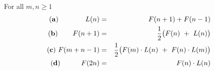 \begin{prop}
\label{thm:Lucas-n:2Fibs}
For all $m, n \geq 1$
\begin{eqnarray}
\label{eq:L-F-a}
{\bf (a)} \  \hspace*{.49in}
L(n) & = & F(n+1) + F(n-1) \\
\label{eq:L-F-b}
{\bf (b)} \  \hspace*{.25in}
F(n+1) & = & \frac{1}{2} \big(F(n) \ + \ L(n) \big) \\
\label{eq:L-F-c}
{\bf (c)} \  
F(m + n-1) & = & \frac{1}{2} \big( F(m) \cdot L(n) \ + \ F(n) \cdot L(m) \big) \\
\label{eq:L-F-d}
{\bf (d)} \ \hspace*{.37in}
F(2n) & = & F(n) \cdot L(n)
\end{eqnarray}
\end{prop}

